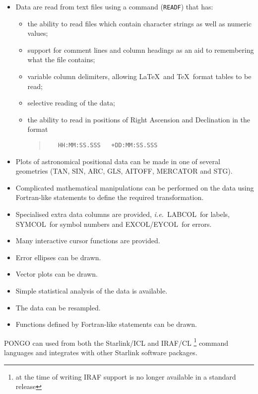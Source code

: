\documentclass[twoside,11pt]{article}
\newcommand{\htmlref}[2]{#1}
\renewcommand{\_}{\texttt{\symbol{95}}}
\newcommand{\ie}{{\em i.e.\ }}
\newcommand{\excol}{{\sf EXCOL}}
\newcommand{\eycol}{{\sf EYCOL}}
\newcommand{\symcol}{{\sf SYMCOL}}
\newcommand{\labcol}{{\sf LABCOL}}
\newcommand{\cnam}[1]{{\tt #1}}
\newcommand{\iref} [1]{\htmlref{#1}{#1}}
\begin{document}
\begin{itemize}
\item Data are read from text files using a command (\cnam{\iref{READF}})
  that has:
  \begin{itemize}
  \item the ability to read files which contain character strings as well as
    numeric values;
  \item support for comment lines and column headings as an aid to remembering
    what the file contains;
  \item variable column delimiters, allowing \LaTeX\ and \TeX\
    format tables to be read;
  \item selective reading of the data;
  \item the ability to read in positions of Right Ascension and
    Declination in the format
    \begin{quote}
\begin{verbatim}
   HH:MM:SS.SSS   +DD:MM:SS.SSS
\end{verbatim}
    \end{quote}
  \end{itemize}
\item Plots of astronomical positional data can be made in one of several
  geometries (TAN, SIN, ARC, GLS, AITOFF, MERCATOR and STG).

\item Complicated mathematical manipulations can be performed on the data
  using  Fortran-like statements to define the required transformation.
\item Specialised extra data columns are provided, \ie \labcol\ for
  labels, \symcol\ for symbol numbers and \excol/\eycol\ for errors.
\item Many interactive cursor functions are provided.
\item Error ellipses can be drawn.
\item Vector plots can be drawn.
\item Simple statistical analysis of the data is available.
\item The data can be resampled.
\item Functions defined by Fortran-like statements can be drawn.
\end{itemize}

PONGO can used from both the Starlink/ICL and IRAF/CL
\footnote{at the time of writing IRAF support is no longer available
in a standard release} command languages and integrates with other Starlink
software packages.
\end{document}
